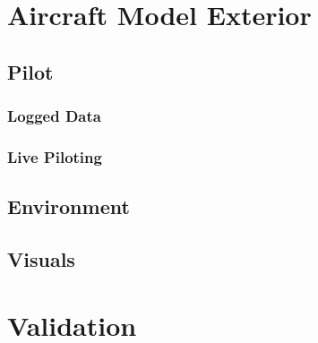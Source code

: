 \section{Aircraft Model Exterior}

\subsection{Pilot}
\subsubsection{Logged Data}
\subsubsection{Live Piloting}

\subsection{Environment}
\subsection{Visuals}
\section{Validation}

%
